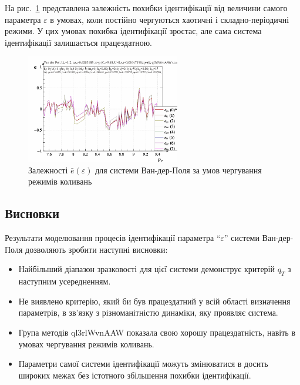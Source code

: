 На рис.~\ref{atu:f:vdp_e_varepsilon_2} представлена залежність похибки
ідентифікації від величини самого параметра
$ \varepsilon $ в умовах, коли постійно чергуються хаотичні і
складно-періодичні режими. У цих умовах похибка ідентифікації
зростає, але сама система ідентифікації залишається
працездатною.


\begin{figure}[ht!]
\begin{center}
  \includegraphics[width=0.60\textwidth]{p/cha/vdp/vdp_id2-p_p_e_ql3rlWvnAAW_scan.png}
\end{center}
  \caption{Залежності $\bar{e}(\varepsilon)$ для системи Ван-дер-Поля за умов чергування режимів коливань}
\label{atu:f:vdp_e_varepsilon_2}
\end{figure}


\subsection{Висновки}%

Результати моделювання процесів ідентифікації параметра ``$\varepsilon$''
системи Ван-дер-Поля дозволяють зробити наступні
висновки:

\begin{itemize}

  \item
    Найбільший діапазон зразковості для цієї системи демонструє
    критерій $ q_T $ з наступним усередненням.

  \item
    Не виявлено критерію, який би був працездатний у всій області
    визначення параметрів, в зв'язку з різноманітністю динаміки,
    яку проявляє система.

  \item
    Група методів ql3rlWvnAAW показала свою хорошу працездатність,
    навіть в умовах чергування режимів коливань.

  \item
    Параметри самої системи ідентифікації можуть змінюватися
    в досить широких межах без істотного збільшення похибки
    ідентифікації.

\end{itemize}





